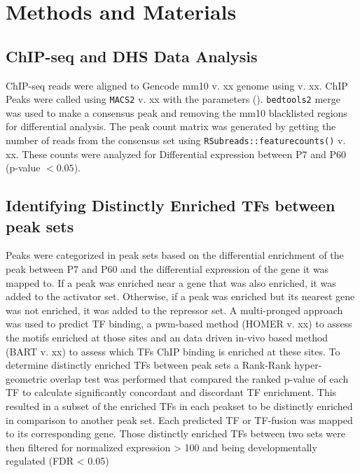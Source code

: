 \documentclass[fleqn,10pt]{wlscirep}
\begin{document}
\subsection*{}

\section*{Methods and Materials}
\subsection*{ChIP-seq and DHS Data Analysis}
ChIP-seq reads were aligned to Gencode mm10 v. xx genome using  v. xx. ChIP Peaks were called using \texttt{MACS2} v. xx with the parameters ().  \texttt{bedtools2} merge was used to make a consensus peak and removing the mm10 blacklisted regions \cite{} for differential analysis. The peak count matrix was generated by getting the number of reads from the consensus set using \texttt{RSubreads::featurecounts()} v. xx. These counts were analyzed for Differential expression between P7 and P60  (p-value $< 0.05$). 


\subsection*{Identifying Distinctly Enriched  TFs between peak sets}
Peaks were categorized in peak sets based on the differential enrichment of the peak between P7 and P60 and the differential expression of the gene it was mapped to. If a peak was enriched near a gene that was also enriched, it was added to the activator set. Otherwise, if a peak was enriched but its nearest gene was not enriched, it was added to the repressor set. A multi-pronged approach was used to predict TF binding, a pwm-based method (HOMER v. xx) \cite{} to assess the motifs enriched at those sites and an data driven in-vivo based method (BART v. xx) \cite{Zhenjiawang2018BART:Profiles, Ma2021BARTweb:Analysis} to assess which TFs ChIP binding is enriched at these sites. To determine distinctly enriched TFs between peak sets a Rank-Rank hyper-geometric overlap test \cite{RRHO} was performed that compared the ranked p-value of each TF  to calculate significantly concordant and discordant TF enrichment. This resulted in a subset of the enriched TFs in each peakset to be distinctly enriched in comparison to another peak set.  Each predicted TF or TF-fusion was mapped to its corresponding gene. Those distinctly enriched TFs between two sets were then filtered for normalized expression > 100 and being developmentally regulated (FDR < 0.05)
\end{document}
